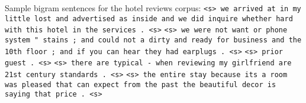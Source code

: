 \documentclass{article}
\begin{document}
Sample bigram sentences for the hotel reviews corpus:\npar
\texttt{<s> we arrived at in my little lost and advertised as inside and we did inquire whether hard with this hotel in the services . <s>}\npar
\texttt{<s> we were not want or phone system " stains ; and could not a dirty and ready for business and the 10th floor ; and if you can hear they had earplugs . <s>}\npar
\texttt{<s> prior guest . <s>}\npar
\texttt{<s> there are typical - when reviewing my girlfriend are 21st century standards . <s>}\npar
\texttt{<s> the entire stay because its a room was pleased that can expect from the past the beautiful decor is saying that price . <s>}\npar
\end{document}
